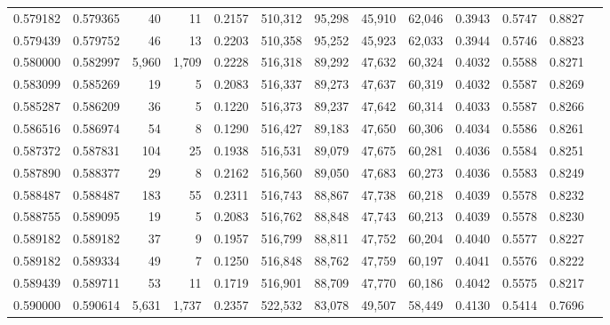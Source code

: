 \begin{tabular}{rrrrrrrrrrrrr}
0.579182 & 0.579365 &     40 &    11 &                                     0.2157 & 510,312 &  95,298 &  45,910 &  62,046 & 0.3943 & 0.5747 & 0.8827 \\
0.579439 & 0.579752 &     46 &    13 &                                     0.2203 & 510,358 &  95,252 &  45,923 &  62,033 & 0.3944 & 0.5746 & 0.8823 \\
0.580000 & 0.582997 &  5,960 & 1,709 &                                     0.2228 & 516,318 &  89,292 &  47,632 &  60,324 & 0.4032 & 0.5588 & 0.8271 \\
0.583099 & 0.585269 &     19 &     5 &                                     0.2083 & 516,337 &  89,273 &  47,637 &  60,319 & 0.4032 & 0.5587 & 0.8269 \\
0.585287 & 0.586209 &     36 &     5 &                                     0.1220 & 516,373 &  89,237 &  47,642 &  60,314 & 0.4033 & 0.5587 & 0.8266 \\
0.586516 & 0.586974 &     54 &     8 &                                     0.1290 & 516,427 &  89,183 &  47,650 &  60,306 & 0.4034 & 0.5586 & 0.8261 \\
0.587372 & 0.587831 &    104 &    25 &                                     0.1938 & 516,531 &  89,079 &  47,675 &  60,281 & 0.4036 & 0.5584 & 0.8251 \\
0.587890 & 0.588377 &     29 &     8 &                                     0.2162 & 516,560 &  89,050 &  47,683 &  60,273 & 0.4036 & 0.5583 & 0.8249 \\
0.588487 & 0.588487 &    183 &    55 &                                     0.2311 & 516,743 &  88,867 &  47,738 &  60,218 & 0.4039 & 0.5578 & 0.8232 \\
0.588755 & 0.589095 &     19 &     5 &                                     0.2083 & 516,762 &  88,848 &  47,743 &  60,213 & 0.4039 & 0.5578 & 0.8230 \\
0.589182 & 0.589182 &     37 &     9 &                                     0.1957 & 516,799 &  88,811 &  47,752 &  60,204 & 0.4040 & 0.5577 & 0.8227 \\
0.589182 & 0.589334 &     49 &     7 &                                     0.1250 & 516,848 &  88,762 &  47,759 &  60,197 & 0.4041 & 0.5576 & 0.8222 \\
0.589439 & 0.589711 &     53 &    11 &                                     0.1719 & 516,901 &  88,709 &  47,770 &  60,186 & 0.4042 & 0.5575 & 0.8217 \\
0.590000 & 0.590614 &  5,631 & 1,737 &                                     0.2357 & 522,532 &  83,078 &  49,507 &  58,449 & 0.4130 & 0.5414 & 0.7696 \\

\end{tabular}
